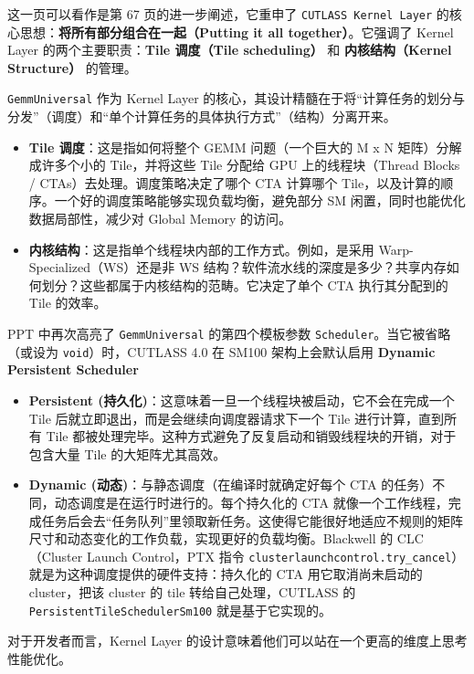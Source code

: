 这一页可以看作是第 67 页的进一步阐述，它重申了 \texttt{CUTLASS Kernel Layer} 的核心思想：\textbf{将所有部分组合在一起（Putting it all together）}。它强调了 Kernel Layer 的两个主要职责：\textbf{Tile 调度（Tile scheduling）} 和 \textbf{内核结构（Kernel Structure）} 的管理。

\texttt{Gemm\allowbreak{}Universal} 作为 Kernel Layer 的核心，其设计精髓在于将“计算任务的划分与分发”（调度）和“单个计算任务的具体执行方式”（结构）分离开来。

\begin{itemize}
\item \textbf{Tile 调度}：这是指如何将整个 GEMM 问题（一个巨大的 M x N 矩阵）分解成许多个小的 Tile，并将这些 Tile 分配给 GPU 上的线程块（Thread Blocks /\allowbreak{} CTAs）去处理。调度策略决定了哪个 CTA 计算哪个 Tile，以及计算的顺序。一个好的调度策略能够实现负载均衡，避免部分 SM 闲置，同时也能优化数据局部性，减少对 Global Memory 的访问。
\item \textbf{内核结构}：这是指单个线程块内部的工作方式。例如，是采用 Warp-Specialized（WS）还是非 WS 结构？软件流水线的深度是多少？共享内存如何划分？这些都属于内核结构的范畴。它决定了单个 CTA 执行其分配到的 Tile 的效率。
\end{itemize}

PPT 中再次高亮了 \texttt{Gemm\allowbreak{}Universal} 的第四个模板参数 \texttt{Scheduler}。当它被省略（或设为 \texttt{void}）时，CUTLASS 4.0 在 SM100 架构上会默认启用 \textbf{Dynamic Persistent Scheduler}

\begin{itemize}
\item \textbf{Persistent (持久化)}：这意味着一旦一个线程块被启动，它不会在完成一个 Tile 后就立即退出，而是会继续向调度器请求下一个 Tile 进行计算，直到所有 Tile 都被处理完毕。这种方式避免了反复启动和销毁线程块的开销，对于包含大量 Tile 的大矩阵尤其高效。
\item \textbf{Dynamic (动态)}：与静态调度（在编译时就确定好每个 CTA 的任务）不同，动态调度是在运行时进行的。每个持久化的 CTA 就像一个工作线程，完成任务后会去“任务队列”里领取新任务。这使得它能很好地适应不规则的矩阵尺寸和动态变化的工作负载，实现更好的负载均衡。Blackwell 的 CLC（Cluster Launch Control，PTX 指令 \texttt{clusterlaunchcontrol.\allowbreak{}try\_\allowbreak{}cancel}）就是为这种调度提供的硬件支持：持久化的 CTA 用它取消尚未启动的 cluster，把该 cluster 的 tile 转给自己处理，CUTLASS 的 \texttt{PersistentTileSchedulerSm100} 就是基于它实现的。
\end{itemize}

对于开发者而言，Kernel Layer 的设计意味着他们可以站在一个更高的维度上思考性能优化。

